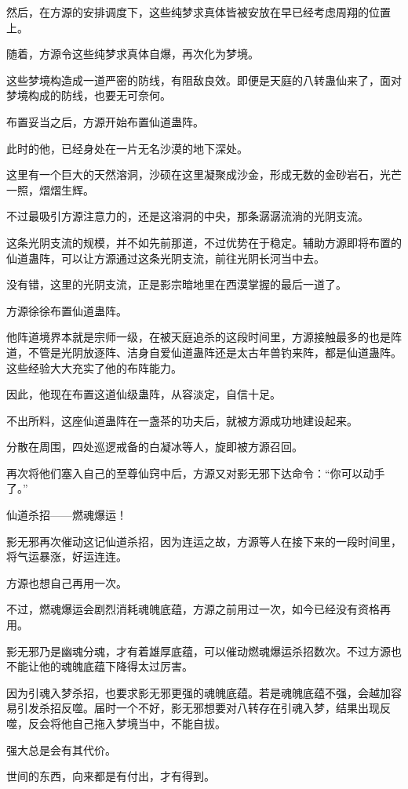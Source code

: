 \begin{this_body}
然后，在方源的安排调度下，这些纯梦求真体皆被安放在早已经考虑周翔的位置上。

随着，方源令这些纯梦求真体自爆，再次化为梦境。

这些梦境构造成一道严密的防线，有阻敌良效。即便是天庭的八转蛊仙来了，面对梦境构成的防线，也要无可奈何。

布置妥当之后，方源开始布置仙道蛊阵。

此时的他，已经身处在一片无名沙漠的地下深处。

这里有一个巨大的天然溶洞，沙硕在这里凝聚成沙金，形成无数的金砂岩石，光芒一照，熠熠生辉。

不过最吸引方源注意力的，还是这溶洞的中央，那条潺潺流淌的光阴支流。

这条光阴支流的规模，并不如先前那道，不过优势在于稳定。辅助方源即将布置的仙道蛊阵，可以让方源通过这条光阴支流，前往光阴长河当中去。

没有错，这里的光阴支流，正是影宗暗地里在西漠掌握的最后一道了。

方源徐徐布置仙道蛊阵。

他阵道境界本就是宗师一级，在被天庭追杀的这段时间里，方源接触最多的也是阵道，不管是光阴放逐阵、洁身自爱仙道蛊阵还是太古年兽钓来阵，都是仙道蛊阵。这些经验大大充实了他的布阵能力。

因此，他现在布置这道仙级蛊阵，从容淡定，自信十足。

不出所料，这座仙道蛊阵在一盏茶的功夫后，就被方源成功地建设起来。

分散在周围，四处巡逻戒备的白凝冰等人，旋即被方源召回。

再次将他们塞入自己的至尊仙窍中后，方源又对影无邪下达命令：“你可以动手了。”

仙道杀招——燃魂爆运！

影无邪再次催动这记仙道杀招，因为连运之故，方源等人在接下来的一段时间里，将气运暴涨，好运连连。

方源也想自己再用一次。

不过，燃魂爆运会剧烈消耗魂魄底蕴，方源之前用过一次，如今已经没有资格再用。

影无邪乃是幽魂分魂，才有着雄厚底蕴，可以催动燃魂爆运杀招数次。不过方源也不能让他的魂魄底蕴下降得太过厉害。

因为引魂入梦杀招，也要求影无邪更强的魂魄底蕴。若是魂魄底蕴不强，会越加容易引发杀招反噬。届时一个不好，影无邪想要对八转存在引魂入梦，结果出现反噬，反会将他自己拖入梦境当中，不能自拔。

强大总是会有其代价。

世间的东西，向来都是有付出，才有得到。


\end{this_body}
